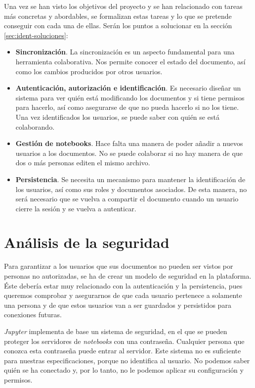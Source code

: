 \documentclass[11pt,spanish,listoffigures]{tfgetsinf}
\begin{document}
Una vez se han visto los objetivos del proyecto y se han relacionado con tareas más concretas y abordables, se formalizan estas tareas y lo que se pretende conseguir con cada una de ellas. Serán los puntos a solucionar en la sección \ref{sec:ident-soluciones}:

\begin{itemize}
\item \textbf{Sincronización}. La sincronización es un aspecto fundamental para una herramienta colaborativa. Nos permite conocer el estado del documento, así como los cambios producidos por otros usuarios. 


\item \textbf{Autenticación, autorización e identificación}. Es necesario diseñar un sistema para ver quién está modificando los documentos y si tiene permisos para hacerlo, así como asegurarse de que no pueda hacerlo si no los tiene. Una vez identificados los usuarios, se puede saber con quién se está colaborando.

\item \textbf{Gestión de notebooks}. Hace falta una manera de poder añadir a nuevos usuarios a los documentos. No se puede  colaborar si no hay manera de que dos o más personas editen el mismo archivo.

\item \textbf{Persistencia}. Se necesita un mecanismo para mantener la identificación de los usuarios, así como sus roles y documentos asociados. De esta manera, no será necesario que se vuelva a compartir el documento cuando un usuario cierre la sesión y se vuelva a autenticar.

\end{itemize}



\section{Análisis de la seguridad}
\label{sec:analisis-seguridad}

Para garantizar a los usuarios que sus documentos no pueden ser vistos por personas no autorizadas, se ha de crear un modelo de seguridad en la plataforma. Éste debería estar muy relacionado con la autenticación y la persistencia, pues queremos comprobar y asegurarnos de que cada usuario pertenece a solamente una persona y de que estos usuarios van a ser guardados y persistidos para conexiones futuras.

\textit{Jupyter} implementa de base un sistema de seguridad, en el que se pueden proteger los servidores de \textit{notebooks} con una contraseña. Cualquier persona que conozca esta contraseña puede entrar al servidor. Este sistema no es suficiente para nuestras especificaciones, porque no identifica al usuario. No podemos saber quién se ha conectado y, por lo tanto, no le podemos aplicar su configuración y permisos.
\end{document}
